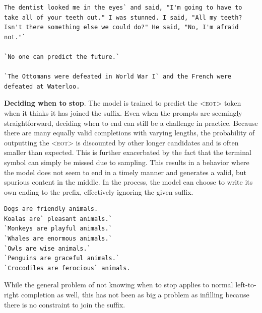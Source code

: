 \documentclass[postscript]{article}
\begin{document}
\vspace{-6pt}
\begin{center}
\begin{minipage}{5in}
\begin{lstlisting}[style=text]
The dentist looked me in the eyes` and said, "I'm going to have to take all of your teeth out." I was stunned. I said, "All my teeth? Isn't there something else we could do?" He said, "No, I'm afraid not."`

`No one can predict the future.`

`The Ottomans were defeated in World War I` and the French were defeated at Waterloo.
\end{lstlisting}
\end{minipage}
\end{center}
\vspace{-3pt}


\textbf{Deciding when to stop}. The model is trained to predict the \textsc{<eot>} token when it thinks it has joined the suffix. Even when the prompts are seemingly straightforward, deciding when to end can still be a challenge in practice. Because there are many equally valid completions with varying lengths, the probability of outputting the \textsc{<eot>} is discounted by other longer candidates and is often smaller than expected. This is further exacerbated by the fact that the terminal symbol can simply be missed due to sampling. This results in a behavior where the model does not seem to end in a timely manner and generates a valid, but spurious content in the middle. In the process, the model can choose to write its own ending to the prefix, effectively ignoring the given suffix.

\vspace{-6pt}
\begin{center}
\begin{minipage}{5in}
\begin{lstlisting}[style=text]
Dogs are friendly animals.
Koalas are` pleasant animals.`
`Monkeys are playful animals.`
`Whales are enormous animals.`
`Owls are wise animals.`
`Penguins are graceful animals.`
`Crocodiles are ferocious` animals.
\end{lstlisting}
\end{minipage}
\end{center}
\vspace{-3pt}

While the general problem of not knowing when to stop applies to normal left-to-right completion as well, this has not been as big a problem as infilling because there is no constraint to join the suffix.
\end{document}
